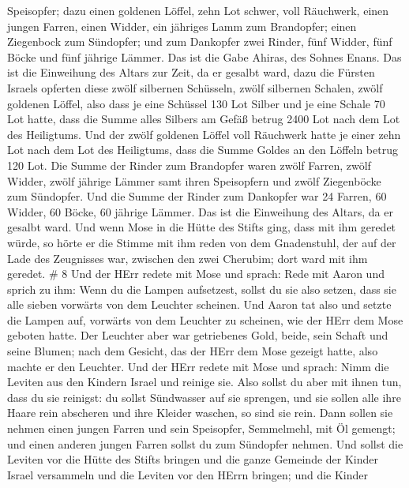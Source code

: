 Speisopfer;  dazu einen goldenen Löffel, zehn Lot schwer,
voll Räuchwerk,  einen jungen Farren, einen Widder, ein
jähriges Lamm zum Brandopfer;  einen Ziegenbock zum
Sündopfer;  und zum Dankopfer zwei Rinder, fünf Widder,
fünf Böcke und fünf jährige Lämmer. Das ist die Gabe Ahiras, des Sohnes
Enans.  Das ist die Einweihung des Altars zur Zeit, da er
gesalbt ward, dazu die Fürsten Israels opferten diese zwölf silbernen
Schüsseln, zwölf silbernen Schalen, zwölf goldenen Löffel, 
also dass je eine Schüssel 130 Lot Silber und je eine Schale 70 Lot
hatte, dass die Summe alles Silbers am Gefäß betrug 2400 Lot nach dem
Lot des Heiligtums.  Und der zwölf goldenen Löffel voll
Räuchwerk hatte je einer zehn Lot nach dem Lot des Heiligtums, dass die
Summe Goldes an den Löffeln betrug 120 Lot.  Die Summe der
Rinder zum Brandopfer waren zwölf Farren, zwölf Widder, zwölf jährige
Lämmer samt ihren Speisopfern und zwölf Ziegenböcke zum Sündopfer.
 Und die Summe der Rinder zum Dankopfer war 24 Farren, 60
Widder, 60 Böcke, 60 jährige Lämmer. Das ist die Einweihung des Altars,
da er gesalbt ward.  Und wenn Mose in die Hütte des Stifts
ging, dass mit ihm geredet würde, so hörte er die Stimme mit ihm reden
von dem Gnadenstuhl, der auf der Lade des Zeugnisses war, zwischen den
zwei Cherubim; dort ward mit ihm geredet. \# 8  Und der HErr
redete mit Mose und sprach:  Rede mit Aaron und sprich zu
ihm: Wenn du die Lampen aufsetzest, sollst du sie also setzen, dass sie
alle sieben vorwärts von dem Leuchter scheinen.  Und Aaron
tat also und setzte die Lampen auf, vorwärts von dem Leuchter zu
scheinen, wie der HErr dem Mose geboten hatte.  Der Leuchter
aber war getriebenes Gold, beide, sein Schaft und seine Blumen; nach dem
Gesicht, das der HErr dem Mose gezeigt hatte, also machte er den
Leuchter.  Und der HErr redete mit Mose und sprach:
 Nimm die Leviten aus den Kindern Israel und reinige sie.
 Also sollst du aber mit ihnen tun, dass du sie reinigst: du
sollst Sündwasser auf sie sprengen, und sie sollen alle ihre Haare rein
abscheren und ihre Kleider waschen, so sind sie rein.  Dann
sollen sie nehmen einen jungen Farren und sein Speisopfer, Semmelmehl,
mit Öl gemengt; und einen anderen jungen Farren sollst du zum Sündopfer
nehmen.  Und sollst die Leviten vor die Hütte des Stifts
bringen und die ganze Gemeinde der Kinder Israel versammeln
 und die Leviten vor den HErrn bringen; und die Kinder
